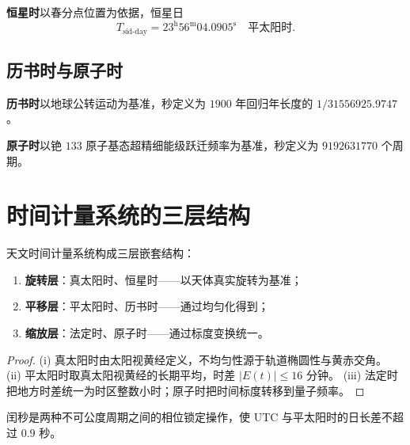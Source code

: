 \begin{definition}[恒星时]\label{def:sidereal_time}
\textbf{恒星时}以春分点位置为依据，恒星日
\[
T_{\text{sid-day}}=23^{\text{h}}56^{\text{m}}04.0905^{\text{s}}\quad\text{平太阳时}.
\]
\end{definition}

\subsection{历书时与原子时}

\begin{definition}[历书时]\label{def:ephemeris_time}
\textbf{历书时}以地球公转运动为基准，秒定义为 \(1900\) 年回归年长度的 \(1/31556925.9747\)。
\end{definition}

\begin{definition}[原子时]\label{def:atomic_time}
\textbf{原子时}以铯 \(133\) 原子基态超精细能级跃迁频率为基准，秒定义为 \(9192631770\) 个周期。
\end{definition}

\section{时间计量系统的三层结构}

\begin{theorem}[时间计量系统的三层结构]\label{thm:time_system_grammar_unity}
天文时间计量系统构成三层嵌套结构：
\begin{enumerate}[label=(\roman*)]
    \item \textbf{旋转层}：真太阳时、恒星时——以天体真实旋转为基准；
    \item \textbf{平移层}：平太阳时、历书时——通过均匀化得到；
    \item \textbf{缩放层}：法定时、原子时——通过标度变换统一。
\end{enumerate}
\end{theorem}

\begin{proof}
(i) 真太阳时由太阳视黄经定义，不均匀性源于轨道椭圆性与黄赤交角。
(ii) 平太阳时取真太阳视黄经的长期平均，时差 \(|E(t)|\le16\) 分钟。
(iii) 法定时把地方时差统一为时区整数小时；原子时把时间标度转移到量子频率。
\end{proof}

\begin{corollary}[闰秒与周期对齐]\label{cor:leap_second_periodic_alignment}
闰秒是两种不可公度周期之间的相位锁定操作，使 UTC 与平太阳时的日长差不超过 \(0.9\) 秒。
\end{corollary}

